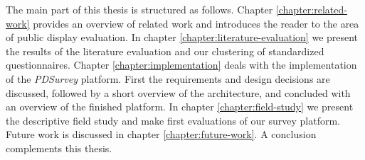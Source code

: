 	The main part of this thesis is structured as follows. Chapter \ref{chapter:related-work} provides an overview of related work and introduces the reader to the area of public display evaluation. In chapter \ref{chapter:literature-evaluation} we present the results of the literature evaluation and our clustering of standardized questionnaires. Chapter \ref{chapter:implementation} deals with the implementation of the \textit{PDSurvey} platform. First the requirements and design decisions are discussed, followed by a short overview of the architecture, and concluded with an overview of the finished platform. In chapter \ref{chapter:field-study} we present the descriptive field study and make first evaluations of our survey platform. Future work is discussed in chapter \ref{chapter:future-work}. A conclusion complements this thesis.













